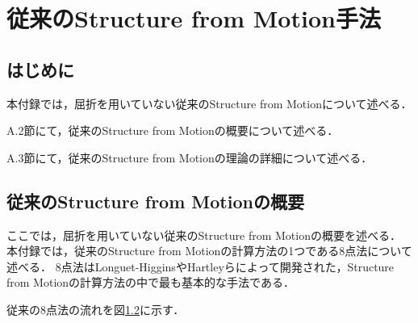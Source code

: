 \chapter{従来のStructure from Motion手法}
\setcounter{page}{1}
\renewcommand{\thepage}{A--\arabic{page}}

\thispagestyle{empty}

\newpage
\section{はじめに}

本付録では，屈折を用いていない従来のStructure from Motionについて述べる．

A.2節にて，従来のStructure from Motionの概要について述べる．

A.3節にて，従来のStructure from Motionの理論の詳細について述べる．



\newpage

\section{従来のStructure from Motionの概要}

ここでは，屈折を用いていない従来のStructure from Motionの概要を述べる．
本付録では，従来のStructure from Motionの計算方法の1つである8点法について述べる．
8点法はLonguet-HigginsやHartleyらによって開発された，Structure from Motionの計算方法の中で最も基本的な手法である\cite{Longuet-Higgins1981}\cite{Hartley2004}．

従来の8点法の流れを\mbox{図\ref{}に示す．}


\newpage

